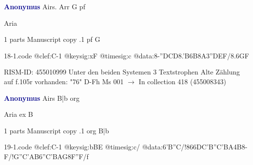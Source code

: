 \documentclass[twocolumn]{book}
\begin{document}
\newline \par \vspace{7pt} \textcolor{darkblue}{\textbf{Anonymus  }}
\newline Airs. Arr  G  
\newline pf
\newline \begin{itshape} Aria\end{itshape} 
\newline \textcolor{darkblue}{}  1 parts  
\newline Manuscript copy
.1  pf  G  
\begin{filecontents*}{18-1.code}
@clef:C-1
@keysig:xF
@timesig:c
@data:8-''D{CD}{8.'B6B}8A{3''DEF}/{8.6GF}
\end{filecontents*}
\newline
%

\newline RISM-ID: 455010999
\newline Unter den beiden Systemen 3 Textstrophen
\newline Alte Zählung auf f.105r vorhanden: "76"
\newline D-Fh  Ms 001
\newline $\rightarrow$ In collection 418 (455008343)

\newline \par \vspace{7pt} \textcolor{darkblue}{\textbf{Anonymus  }}
\newline Airs  B|b  
\newline org
\newline \begin{itshape}[f.115r, heading:] Aria ex B\end{itshape} 
\newline \textcolor{darkblue}{}  1 parts  
\newline Manuscript copy
.1  org  B|b  
\begin{filecontents*}{19-1.code}
@clef:C-1
@keysig:bBE
@timesig:c/
@data:{6'B''C}/!{866DC'B}{''C'BA}4B8-F/!{G''C}{'AB}{6''C'BAG}{8F''F}/f
\end{filecontents*}
\newline
%
\end{document}
